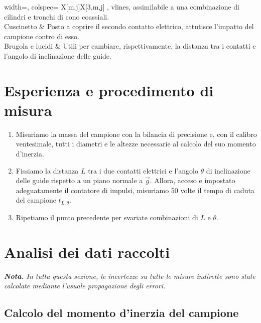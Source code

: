 \documentclass{article}
\begin{document}
\begin{center}
\begin{tblr}{
        width=\textwidth,
        colspec={ X[m,j]X[3,m,j] },
        vlines,
    }
{            assimilabile a una combinazione di
            cilindri e tronchi di cono coassiali.
        } \\
        \hline[dashed]
        Cuscinetto & {
            Posto a coprire il secondo contatto
            elettrico, attutisce l'impatto del campione
            contro di esso.
        } \\
        \hline[dashed]
        Brugola e lucidi & {
            Utili per cambiare, rispettivamente,
            la distanza tra i contatti e l'angolo
            di inclinazione delle guide.
        } \\
        \hline
    \end{tblr}
\end{center}

\section{Esperienza e procedimento di misura}
\begin{enumerate}
    \item
        Misuriamo la massa del campione con la bilancia di precisione
        e, con il calibro ventesimale, tutti i diametri e le altezze
        necessarie al calcolo del suo momento d'inerzia.
    \item
        Fissiamo la distanza $L$ tra i due contatti elettrici
        e l'angolo $\theta$ di inclinazione delle guide
        rispetto a un piano normale a $\vec{g}$.
        Allora, acceso e impostato adeguatamente il contatore
        di impulsi, misuriamo 50 volte il tempo di caduta del
        campione $t_{L,\theta}$.
    \item
        Ripetiamo il punto precedente per svariate combinazioni
        di $L$ e $\theta$.

\end{enumerate}

\section{Analisi dei dati raccolti}

\emph{
    \textbf{Nota.} In tutta questa sezione, le incertezze su tutte le misure
    indirette sono state calcolate mediante l'usuale propagazione degli
    errori.
}

\subsection{Calcolo del momento d'inerzia del campione}
\end{document}
